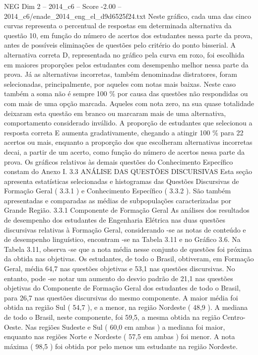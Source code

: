\begin{textsample}{NEG Dim 2 – 2014\_c6 – Score -2.00 – 2014\_c6/enade\_2014\_eng\_el\_d9d6525f24.txt}
Neste gráfico, cada uma das cinco curvas representa o percentual de respostas em determinada alternativa da questão 10, em função do número de acertos dos estudantes nessa parte da prova, antes de possíveis eliminações de questões pelo critério do ponto bisserial.
A alternativa correta D, representada no gráfico pela curva em roxo, foi escolhida em maiores proporções pelos estudantes com desempenho melhor nessa parte da prova.
Já as alternativas incorretas, também denominadas distratores, foram selecionadas, principalmente, por aqueles com notas mais baixas.
Neste caso também a soma não é sempre 100 \% por causa das questões não respondidas ou com mais de uma opção marcada.
Aqueles com nota zero, na sua quase totalidade deixaram esta questão em branco ou marcaram mais de uma alternativa, comportamento considerado inválido.
A proporção de estudantes que selecionou a resposta correta E aumenta gradativamente, chegando a atingir 100 \% para 22 acertos ou mais, enquanto a proporção dos que escolheram alternativas incorretas decai, a partir de um acerto, como função do número de acertos nessa parte da prova.
Os gráficos relativos às demais questões do Conhecimento Específico constam do Anexo I. 3.3 ANÁLISE DAS QUESTÕES DISCURSIVAS Esta seção apresenta estatísticas selecionadas e histogramas das Questões Discursivas de Formação Geral ( 3.3.1 ) e Conhecimento Específico ( 3.3.2 ).
São também apresentadas e comparadas as médias de subpopulações caracterizadas por Grande Região. 3.3.1 Componente de Formação Geral As análises dos resultados de desempenho dos estudantes de Engenharia Elétrica nas duas questões discursivas relativas à Formação Geral, considerando -se as notas de conteúdo e de desempenho linguístico, encontram -se na Tabela 3.11 e no Gráfico 3.6.
Na Tabela 3.11, observa -se que a nota média nesse conjunto de questões foi próxima da obtida nas objetivas.
Os estudantes, de todo o Brasil, obtiveram, em Formação Geral, média 64,7 nas questões objetivas e 53,1 nas questões discursivas.
No entanto, pode -se notar um aumento do desvio padrão de 21,1 nas questões objetivas do Componente de Formação Geral dos estudantes de todo o Brasil, para 26,7 nas questões discursivas do mesmo componente.
A maior média foi obtida na região Sul ( 54,7 ), e a menor, na região Nordeste ( 48,9 ).
A mediana de todo o Brasil, neste componente, foi 59,5, a mesma obtida na região Centro-Oeste.
Nas regiões Sudeste e Sul ( 60,0 em ambas ) a mediana foi maior, enquanto nas regiões Norte e Nordeste ( 57,5 em ambas ) foi menor.
A nota máxima ( 98,5 ) foi obtida por pelo menos um estudante na região Nordeste.

\end{textsample}
